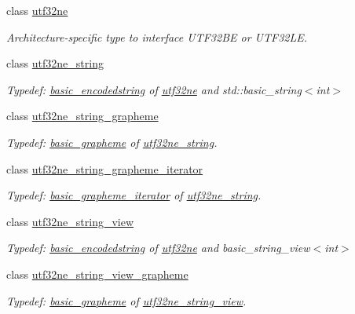 \begin{DoxyCompactItemize}
class \hyperlink{classu5e_1_1utf32ne}{utf32ne}
\begin{DoxyCompactList}\small\item\em Architecture-\/specific type to interface U\+T\+F32\+BE or U\+T\+F32\+LE. \end{DoxyCompactList}\item 
class \hyperlink{classu5e_1_1utf32ne__string}{utf32ne\+\_\+string}
\begin{DoxyCompactList}\small\item\em Typedef\+: \hyperlink{classu5e_1_1basic__encodedstring}{basic\+\_\+encodedstring} of \hyperlink{classu5e_1_1utf32ne}{utf32ne} and std\+::basic\+\_\+string$<$int$>$ \end{DoxyCompactList}\item 
class \hyperlink{classu5e_1_1utf32ne__string__grapheme}{utf32ne\+\_\+string\+\_\+grapheme}
\begin{DoxyCompactList}\small\item\em Typedef\+: \hyperlink{classu5e_1_1basic__grapheme}{basic\+\_\+grapheme} of \hyperlink{classu5e_1_1utf32ne__string}{utf32ne\+\_\+string}. \end{DoxyCompactList}\item 
class \hyperlink{classu5e_1_1utf32ne__string__grapheme__iterator}{utf32ne\+\_\+string\+\_\+grapheme\+\_\+iterator}
\begin{DoxyCompactList}\small\item\em Typedef\+: \hyperlink{classu5e_1_1basic__grapheme__iterator}{basic\+\_\+grapheme\+\_\+iterator} of \hyperlink{classu5e_1_1utf32ne__string}{utf32ne\+\_\+string}. \end{DoxyCompactList}\item 
class \hyperlink{classu5e_1_1utf32ne__string__view}{utf32ne\+\_\+string\+\_\+view}
\begin{DoxyCompactList}\small\item\em Typedef\+: \hyperlink{classu5e_1_1basic__encodedstring}{basic\+\_\+encodedstring} of \hyperlink{classu5e_1_1utf32ne}{utf32ne} and basic\+\_\+string\+\_\+view$<$int$>$ \end{DoxyCompactList}\item 
class \hyperlink{classu5e_1_1utf32ne__string__view__grapheme}{utf32ne\+\_\+string\+\_\+view\+\_\+grapheme}
\begin{DoxyCompactList}\small\item\em Typedef\+: \hyperlink{classu5e_1_1basic__grapheme}{basic\+\_\+grapheme} of \hyperlink{classu5e_1_1utf32ne__string__view}{utf32ne\+\_\+string\+\_\+view}. \end{DoxyCompactList}\item 

\end{DoxyCompactItemize}
